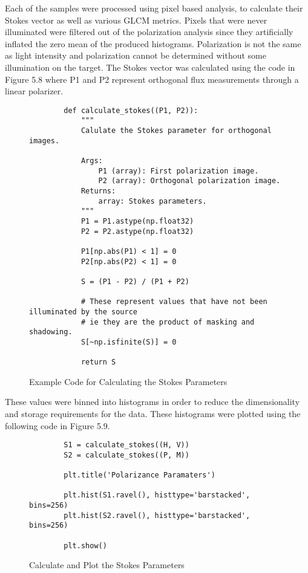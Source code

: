 Each of the samples were processed using pixel based analysis, to calculate their Stokes vector as well as various GLCM metrics.  Pixels that were never illuminated were filtered out of the polarization analysis since they artificially inflated the zero mean of the produced histograms.  Polarization is not the same as light intensity and polarization cannot be determined without some illumination on the target.  The Stokes vector was calculated using the code in Figure 5.8 where P1 and P2 represent orthogonal flux measurements through a linear polarizer.
%
\begin{figure}
    \begin{lstlisting}
        def calculate_stokes((P1, P2)):
            """
            Calulate the Stokes parameter for orthogonal images.

            Args:
                P1 (array): First polarization image.
                P2 (array): Orthogonal polarization image.
            Returns:
                array: Stokes parameters.
            """
            P1 = P1.astype(np.float32)
            P2 = P2.astype(np.float32)

            P1[np.abs(P1) < 1] = 0
            P2[np.abs(P2) < 1] = 0

            S = (P1 - P2) / (P1 + P2)

            # These represent values that have not been illuminated by the source
            # ie they are the product of masking and shadowing.
            S[~np.isfinite(S)] = 0

            return S
    \end{lstlisting}
    \caption{Example Code for Calculating the Stokes Parameters}
    \label{fig:scattering}
\end{figure}
%
These values were binned into histograms in order to reduce the dimensionality and storage requirements for the data.  These histograms were plotted using the following code in Figure 5.9.
%
\begin{figure}
    \begin{lstlisting}
        S1 = calculate_stokes((H, V))
        S2 = calculate_stokes((P, M))

        plt.title('Polarizance Paramaters')

        plt.hist(S1.ravel(), histtype='barstacked', bins=256)
        plt.hist(S2.ravel(), histtype='barstacked', bins=256)

        plt.show()
    \end{lstlisting}
    \caption{Calculate and Plot the Stokes Parameters}
    \label{fig:scattering}
\end{figure}
